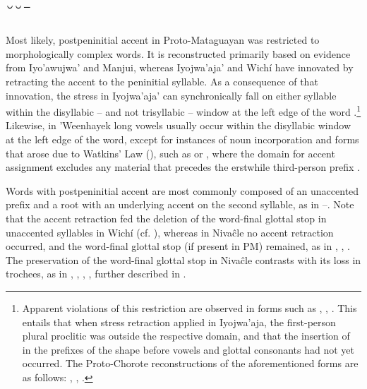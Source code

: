 \subsection{˘˘¯} \label{corta-corta-larga}

Most likely, postpeninitial accent in Proto-Mataguayan was restricted to morphologically complex words. It is reconstructed primarily based on evidence from Iyo'awujwa' and Manjui, whereas Iyojwa'aja' and Wichí have innovated by retracting the accent to the peninitial syllable. As a consequence of that innovation, the stress in Iyojwa'aja' can synchronically fall on either syllable within the disyllabic -- and not trisyllabic -- window at the left edge of the word \citep[91–2]{JC14b}.\footnote{Apparent violations of this restriction are observed in forms such as , , . This entails that when stress retraction applied in Iyojwa'aja, the first-person plural proclitic  was outside the respective domain, and that the insertion of  in the prefixes of the shape  before vowels and glottal consonants had not yet occurred. The Proto-Chorote reconstructions of the aforementioned forms are as follows: , , .} Likewise, in 'Weenhayek long vowels usually occur within the disyllabic window at the left edge of the word, except for instances of noun incorporation \citep[9]{KC94} and forms that arose due to Watkins' Law (), such as  or , where the domain for accent assignment excludes any material that precedes the erstwhile third-person prefix .

Words with postpeninitial accent are most commonly composed of an unaccented prefix and a root with an underlying accent on the second syllable, as in –. Note that the accent retraction fed the deletion of the word-final glottal stop in unaccented syllables in Wichí (cf. ), whereas in Nivaĉle no accent retraction occurred, and the word-final glottal stop (if present in PM) remained, as in , , . The preservation of the word-final glottal stop in Nivaĉle contrasts with its loss in trochees, as in , , , , further described in .

